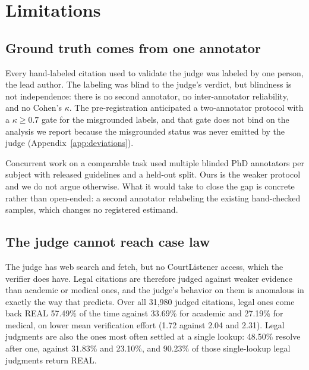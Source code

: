
\section{Limitations}
\label{sec:limitations}

\subsection{Ground truth comes from one annotator}

Every hand-labeled citation used to validate the judge was labeled by one
person, the lead author. The labeling was blind to the judge's verdict, but
blindness is not independence: there is no second annotator, no
inter-annotator reliability, and no Cohen's $\kappa$. The pre-registration
anticipated a two-annotator protocol with a $\kappa \geq 0.7$ gate for the
misgrounded labels, and that gate does not bind on the analysis we report
because the misgrounded status was never emitted by the judge
(Appendix~\ref{app:deviations}).

Concurrent work on a comparable task used multiple blinded PhD annotators per
subject with released guidelines and a held-out split. Ours is the weaker
protocol and we do not argue otherwise. What it would take to close the gap is
concrete rather than open-ended: a second annotator relabeling the existing
hand-checked samples, which changes no registered estimand.

\subsection{The judge cannot reach case law}

The judge has web search and fetch, but no CourtListener access, which the
verifier does have. Legal citations are therefore judged against weaker
evidence than academic or medical ones, and the judge's behavior on them is
anomalous in exactly the way that predicts. Over all 31,980 judged citations,
legal ones come back REAL 57.49\% of the time against 33.69\% for academic and
27.19\% for medical, on lower mean verification effort (1.72 against 2.04 and
2.31). Legal judgments are also the ones most often settled at a single lookup:
48.50\% resolve after one, against 31.83\% and 23.10\%, and 90.23\% of those
single-lookup legal judgments return REAL.

